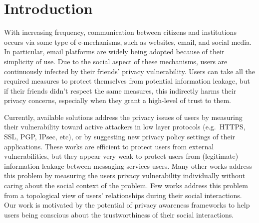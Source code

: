 \section{Introduction} \label{sec:Introduction}

With increasing frequency,
	communication between citizens and institutions occurs via some type of e-mechanisms,
	such as websites,
	email,
	and social media.
In particular,
	email platforms are widely being adopted because of their simplicity of use.
Due to the social aspect of these mechanisms,
	users are continuously infected by their friends' privacy vulnerability.
Users can take all the required measures to protect themselves from potential information leakage,
	but if their friends didn't respect the same measures,
	this indirectly harms their privacy concerns,
	especially when they grant a high-level of trust to them.

Currently,
	available solutions address the privacy issues of users by measuring their vulnerability toward active attackers in low layer protocols (e.g.~HTTPS,
	SSL,
	PGP,
	IPsec,
	etc),
	or by suggesting new privacy policy settings of their applications.
These works are efficient to protect users from external vulnerabilities,
	but they appear very weak to protect users from (legitimate) information leakage between messaging services users.
Many other works \cite{liu_framework_2010} address this problem by measuring the users privacy vulnerability individually without caring about the social context of the problem.
Few works \cite{zeng_trustaware_2014} \cite{b.s._privacy_2015} address this problem from a topological view of users' relationships during their social interactions.
Our work is motivated by the potential of privacy awareness frameworks to help users being conscious about the trustworthiness of their social interactions.

